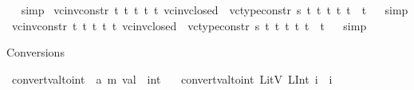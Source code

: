 \begin{isabellebody}
\isadelimproof
\ %
\endisadelimproof
%
\isatagproof
{}\isamarkupfalse%
\ simp%
\endisatagproof
{\isafoldproof}%
%
\isadelimproof
%
\endisadelimproof
\isanewline
{}\isamarkupfalse%
\ vc{\isacharunderscore}{\kern0pt}inv{\isacharunderscore}{\kern0pt}constr{\isacharunderscore}{\kern0pt}{}{}{\isacharcolon}{\kern0pt}{\isachardoublequoteopen}{\isasymforall}\ t{}\ t{}\ t{}\ t{}\ t{}{\isachardot}{\kern0pt}\ vc{\isacharunderscore}{\kern0pt}inv{\isacharunderscore}{\kern0pt}closed\ {}\ {\isacharparenleft}{\kern0pt}vc{\isacharunderscore}{\kern0pt}type{\isacharunderscore}{\kern0pt}constr{}\ s\ t{}\ t{}\ t{}\ t{}\ t{}{\isacharparenright}{\kern0pt}\ {\isacharequal}{\kern0pt}\ t{}{\isachardoublequoteclose}%
\isadelimproof
\ %
\endisadelimproof
%
\isatagproof
{}\isamarkupfalse%
\ simp%
\endisatagproof
{\isafoldproof}%
%
\isadelimproof
%
\endisadelimproof
\isanewline
{}\isamarkupfalse%
\ vc{\isacharunderscore}{\kern0pt}inv{\isacharunderscore}{\kern0pt}constr{\isacharunderscore}{\kern0pt}{}{}{\isacharcolon}{\kern0pt}{\isachardoublequoteopen}{\isasymforall}\ t{}\ t{}\ t{}\ t{}\ t{}{\isachardot}{\kern0pt}\ vc{\isacharunderscore}{\kern0pt}inv{\isacharunderscore}{\kern0pt}closed\ {}\ {\isacharparenleft}{\kern0pt}vc{\isacharunderscore}{\kern0pt}type{\isacharunderscore}{\kern0pt}constr{}\ s\ t{}\ t{}\ t{}\ t{}\ t{}{\isacharparenright}{\kern0pt}\ {\isacharequal}{\kern0pt}\ t{}{\isachardoublequoteclose}%
\isadelimproof
\ %
\endisadelimproof
%
\isatagproof
{}\isamarkupfalse%
\ simp%
\endisatagproof
{\isafoldproof}%
%
\isadelimproof
%
\endisadelimproof
%
\begin{isamarkuptext}%
Conversions%
\end{isamarkuptext}\isamarkuptrue%
\isamarkupfalse%
\ convert{\isacharunderscore}{\kern0pt}val{\isacharunderscore}{\kern0pt}to{\isacharunderscore}{\kern0pt}int\ {\isacharcolon}{\kern0pt}{\isacharcolon}{\kern0pt}\ {\isachardoublequoteopen}{\isacharparenleft}{\kern0pt}{\isacharprime}{\kern0pt}a{\isacharcomma}{\kern0pt}\ {\isacharprime}{\kern0pt}m{\isacharparenright}{\kern0pt}\ val\ {\isasymRightarrow}\ int{\isachardoublequoteclose}\isanewline
\ \ \ {\isachardoublequoteopen}convert{\isacharunderscore}{\kern0pt}val{\isacharunderscore}{\kern0pt}to{\isacharunderscore}{\kern0pt}int\ {\isacharparenleft}{\kern0pt}LitV\ {\isacharparenleft}{\kern0pt}LInt\ i{\isacharparenright}{\kern0pt}{\isacharparenright}{\kern0pt}\ {\isacharequal}{\kern0pt}\ i{\isachardoublequoteclose}\isanewline

\end{isabellebody}
